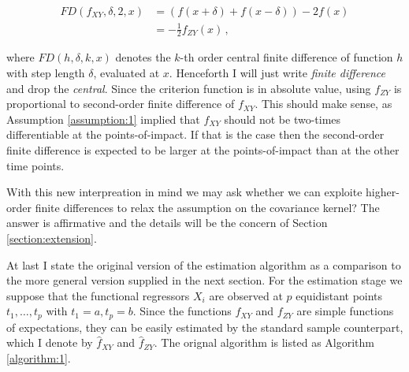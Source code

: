 \begin{align*}
    FD(f_{XY}, \delta, 2, x) &= \left( f(x + \delta) + f(x - \delta) \right) - 2 f(x)\\
                             &= - \frac{1}{2} f_{ZY}(x) \,,
\end{align*}

where $FD(h, \delta, k, x)$ denotes the $k$-th order central finite difference of
function $h$ with step length $\delta$, evaluated at $x$. Henceforth I will just write
\emph{finite difference} and drop the \emph{central}. Since the criterion function is in
absolute value, using $f_{ZY}$ is proportional to second-order finite difference of
$f_{XY}$. This should make sense, as Assumption \ref{assumption:1} implied that $f_{XY}$
should not be two-times differentiable at the points-of-impact. If that is the case then
the second-order finite difference is expected to be larger at the points-of-impact than
at the other time points.


With this new interpreation in mind we may ask whether we can exploite higher-order
finite differences to relax the assumption on the covariance kernel? The answer is
affirmative and the details will be the concern of Section \ref{section:extension}.


At last I state the original version of the estimation algorithm as a comparison to the
more general version supplied in the next section. For the estimation stage we suppose
that the functional regressors $X_i$ are observed at $p$ equidistant points $t_1, \dots,
t_p$ with $t_1 = a, t_p = b$. Since the functions $f_{XY}$ and $f_{ZY}$ are simple
functions of expectations, they can be easily estimated by the standard sample
counterpart, which I denote by $\hat{f}_{XY}$ and $\hat{f}_{ZY}$. The orignal algorithm
is listed as Algorithm \ref{algorithm:1}.

